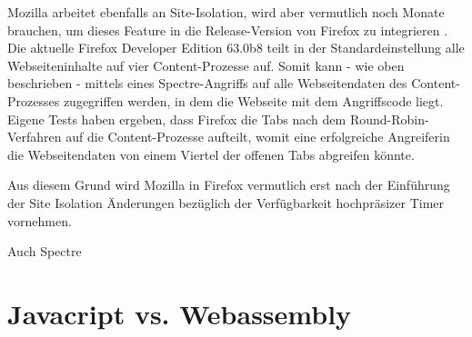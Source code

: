 
Mozilla arbeitet ebenfalls an Site-Isolation, wird aber vermutlich noch Monate brauchen, um dieses Feature in die Release-Version von Firefox zu integrieren \cite{FirefoxSiteIsolation}.
Die aktuelle Firefox Developer Edition 63.0b8 teilt in der Standardeinstellung alle Webseiteninhalte auf vier Content-Prozesse auf. 
Somit kann - wie oben beschrieben - mittels eines Spectre-Angriffs auf alle Webseitendaten des Content-Prozesses zugegriffen werden, in dem die Webseite mit dem Angriffscode liegt.
Eigene Tests haben ergeben, dass Firefox die Tabs nach dem Round-Robin-Verfahren auf die Content-Prozesse aufteilt, womit eine erfolgreiche Angreiferin die Webseitendaten von einem Viertel der offenen Tabs abgreifen könnte.

Aus diesem Grund wird Mozilla in Firefox vermutlich erst nach der Einführung der Site Isolation Änderungen bezüglich der Verfügbarkeit hochpräsizer Timer vornehmen.



Auch Spectre



\section{Javacript vs. Webassembly}
\label{JavascriptVSWasm}

